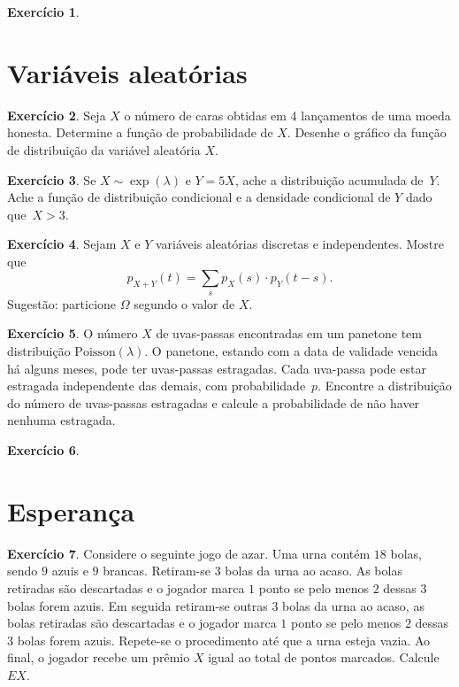 \documentclass[12pt,a4paper]{article}
\theoremstyle{definition}
\newtheorem{exercise}{Exercício}
\begin{document}
\begin{exercise}
\end{exercise}

\clearpage
\section{Variáveis aleatórias}

\begin{exercise}
Seja $X$ o número de caras obtidas em 4 lançamentos de uma moeda honesta.
Determine a função de probabilidade de $X$.
Desenhe o gráfico da função de distribuição da variável aleatória $X$.
\end{exercise}

\begin{exercise}
Se $X\sim\exp(\lambda)$ e $Y=5X$, ache a distribuição acumulada de~$Y$.
Ache a função de distribuição condicional e a densidade condicional de $Y$ dado que~$X>3$.
\end{exercise}

\begin{exercise}
Sejam $X$ e $Y$ variáveis aleatórias discretas e independentes.
Mostre que
$$ p_{X+Y}(t) = \sum_s p_X(s) \cdot p_Y(t-s).$$
Sugestão: particione $\Omega$ segundo o valor de $X$.
\end{exercise}

\begin{exercise}
O número $X$ de uvas-passas encontradas em um panetone tem distribuição $\mathrm{Poisson}(\lambda)$.
O panetone, estando com a data de validade vencida há alguns meses,
pode ter uvas-passas estragadas.
Cada uva-passa pode estar estragada independente das demais, com probabilidade~$p$.
Encontre a distribuição do número de uvas-passas estragadas e calcule a probabilidade de não haver nenhuma estragada.
\end{exercise}

\begin{exercise}
\end{exercise}


\clearpage
\section{Esperança}

\begin{exercise}
Considere o seguinte jogo de azar.
Uma urna contém $18$ bolas, sendo $9$ azuis e $9$ brancas.
Retiram-se $3$ bolas da urna ao acaso.
As bolas retiradas são descartadas e o jogador marca $1$ ponto se pelo menos $2$ dessas $3$ bolas forem azuis.
Em seguida retiram-se outras $3$ bolas da urna ao acaso, as bolas retiradas são descartadas e o jogador marca $1$ ponto se pelo menos $2$ dessas $3$ bolas forem azuis.
Repete-se o procedimento até que a urna esteja vazia.
Ao final, o jogador recebe um prêmio $X$ igual ao total de pontos marcados.
Calcule $EX$.
\end{exercise}
\end{document}
